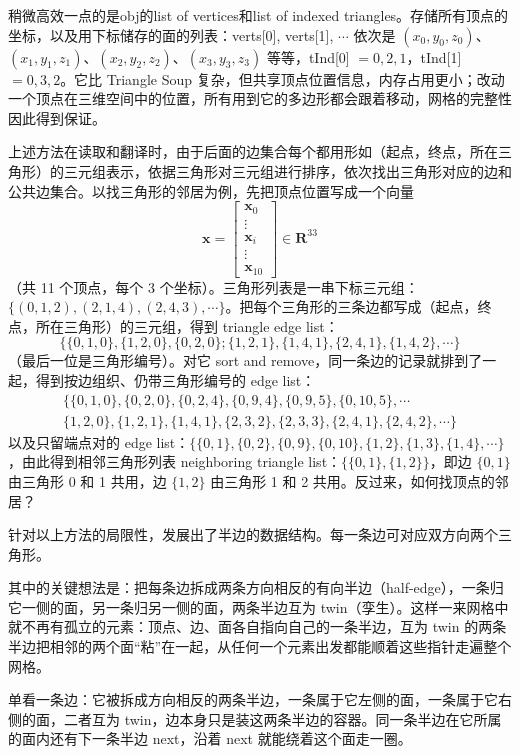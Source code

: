 稍微高效一点的是obj的list of vertices和list of indexed triangles。存储所有顶点的坐标，以及用下标储存的面的列表：verts[0], verts[1], $\cdots$ 依次是 $(x_0, y_0, z_0)$、$(x_1, y_1, z_1)$、$(x_2, y_2, z_2)$、$(x_3, y_3, z_3)$ 等等，tInd[0] $= 0, 2, 1$，tInd[1] $= 0, 3, 2$。它比 Triangle Soup 复杂，但共享顶点位置信息，内存占用更小；改动一个顶点在三维空间中的位置，所有用到它的多边形都会跟着移动，网格的完整性因此得到保证。

上述方法在读取和翻译时，由于后面的边集合每个都用形如（起点，终点，所在三角形）的三元组表示，依据三角形对三元组进行排序，依次找出三角形对应的边和公共边集合。以找三角形的邻居为例，先把顶点位置写成一个向量
\[
\mathbf{x} = \begin{bmatrix} \mathbf{x}_0 \\ \vdots \\ \mathbf{x}_i \\ \vdots \\ \mathbf{x}_{10} \end{bmatrix} \in \mathbf{R}^{33}
\]
（共 11 个顶点，每个 3 个坐标）。三角形列表是一串下标三元组：$\{(0,1,2), (2,1,4), (2,4,3), \cdots\}$。把每个三角形的三条边都写成（起点，终点，所在三角形）的三元组，得到 triangle edge list：
\[
\{\{0,1,0\}, \{1,2,0\}, \{0,2,0\}; \{1,2,1\}, \{1,4,1\}, \{2,4,1\}, \{1,4,2\}, \cdots\}
\]
（最后一位是三角形编号）。对它 sort and remove，同一条边的记录就排到了一起，得到按边组织、仍带三角形编号的 edge list：
\[
\begin{gathered}
\{\{0,1,0\}, \{0,2,0\}, \{0,2,4\}, \{0,9,4\}, \{0,9,5\}, \{0,10,5\}, \cdots \\
\{1,2,0\}, \{1,2,1\}, \{1,4,1\}, \{2,3,2\}, \{2,3,3\}, \{2,4,1\}, \{2,4,2\}, \cdots\}
\end{gathered}
\]
以及只留端点对的 edge list：$\{\{0,1\}, \{0,2\}, \{0,9\}, \{0,10\}, \{1,2\}, \{1,3\}, \{1,4\}, \cdots\}$，由此得到相邻三角形列表 neighboring triangle list：$\{\{0,1\}, \{1,2\}\}$，即边 $\{0,1\}$ 由三角形 0 和 1 共用，边 $\{1,2\}$ 由三角形 1 和 2 共用。反过来，如何找顶点的邻居？

针对以上方法的局限性，发展出了半边的数据结构。每一条边可对应双方向两个三角形。

其中的关键想法是：把每条边拆成两条方向相反的有向半边（half-edge），一条归它一侧的面，另一条归另一侧的面，两条半边互为 twin（孪生）。这样一来网格中就不再有孤立的元素：顶点、边、面各自指向自己的一条半边，互为 twin 的两条半边把相邻的两个面“粘”在一起，从任何一个元素出发都能顺着这些指针走遍整个网格。

单看一条边：它被拆成方向相反的两条半边，一条属于它左侧的面，一条属于它右侧的面，二者互为 twin，边本身只是装这两条半边的容器。同一条半边在它所属的面内还有下一条半边 next，沿着 next 就能绕着这个面走一圈。


